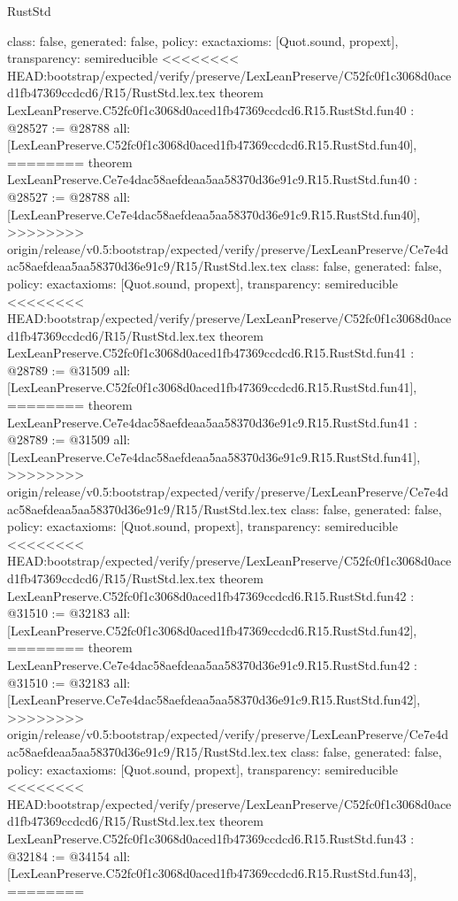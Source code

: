 \begin{lexlean}{RustStd}
\begin{coremodule}
{\begin{coremodule}
{{{{{{{{{{{{{{{{{{{{{{{{{{{{{{{{{{{{{{{{{{{  class: false,
  generated: false,
  policy: exact{axioms: [Quot.sound, propext]},
  transparency: semireducible
}
<<<<<<<< HEAD:bootstrap/expected/verify/preserve/LexLeanPreserve/C52fc0f1c3068d0aced1fb47369ccdcd6/R15/RustStd.lex.tex
theorem LexLeanPreserve.C52fc0f1c3068d0aced1fb47369ccdcd6.R15.RustStd.fun40 : @28527 := @28788 {
  all: [LexLeanPreserve.C52fc0f1c3068d0aced1fb47369ccdcd6.R15.RustStd.fun40],
========
theorem LexLeanPreserve.Ce7e4dac58aefdeaa5aa58370d36e91c9.R15.RustStd.fun40 : @28527 := @28788 {
  all: [LexLeanPreserve.Ce7e4dac58aefdeaa5aa58370d36e91c9.R15.RustStd.fun40],
>>>>>>>> origin/release/v0.5:bootstrap/expected/verify/preserve/LexLeanPreserve/Ce7e4dac58aefdeaa5aa58370d36e91c9/R15/RustStd.lex.tex
  class: false,
  generated: false,
  policy: exact{axioms: [Quot.sound, propext]},
  transparency: semireducible
}
<<<<<<<< HEAD:bootstrap/expected/verify/preserve/LexLeanPreserve/C52fc0f1c3068d0aced1fb47369ccdcd6/R15/RustStd.lex.tex
theorem LexLeanPreserve.C52fc0f1c3068d0aced1fb47369ccdcd6.R15.RustStd.fun41 : @28789 := @31509 {
  all: [LexLeanPreserve.C52fc0f1c3068d0aced1fb47369ccdcd6.R15.RustStd.fun41],
========
theorem LexLeanPreserve.Ce7e4dac58aefdeaa5aa58370d36e91c9.R15.RustStd.fun41 : @28789 := @31509 {
  all: [LexLeanPreserve.Ce7e4dac58aefdeaa5aa58370d36e91c9.R15.RustStd.fun41],
>>>>>>>> origin/release/v0.5:bootstrap/expected/verify/preserve/LexLeanPreserve/Ce7e4dac58aefdeaa5aa58370d36e91c9/R15/RustStd.lex.tex
  class: false,
  generated: false,
  policy: exact{axioms: [Quot.sound, propext]},
  transparency: semireducible
}
<<<<<<<< HEAD:bootstrap/expected/verify/preserve/LexLeanPreserve/C52fc0f1c3068d0aced1fb47369ccdcd6/R15/RustStd.lex.tex
theorem LexLeanPreserve.C52fc0f1c3068d0aced1fb47369ccdcd6.R15.RustStd.fun42 : @31510 := @32183 {
  all: [LexLeanPreserve.C52fc0f1c3068d0aced1fb47369ccdcd6.R15.RustStd.fun42],
========
theorem LexLeanPreserve.Ce7e4dac58aefdeaa5aa58370d36e91c9.R15.RustStd.fun42 : @31510 := @32183 {
  all: [LexLeanPreserve.Ce7e4dac58aefdeaa5aa58370d36e91c9.R15.RustStd.fun42],
>>>>>>>> origin/release/v0.5:bootstrap/expected/verify/preserve/LexLeanPreserve/Ce7e4dac58aefdeaa5aa58370d36e91c9/R15/RustStd.lex.tex
  class: false,
  generated: false,
  policy: exact{axioms: [Quot.sound, propext]},
  transparency: semireducible
}
<<<<<<<< HEAD:bootstrap/expected/verify/preserve/LexLeanPreserve/C52fc0f1c3068d0aced1fb47369ccdcd6/R15/RustStd.lex.tex
theorem LexLeanPreserve.C52fc0f1c3068d0aced1fb47369ccdcd6.R15.RustStd.fun43 : @32184 := @34154 {
  all: [LexLeanPreserve.C52fc0f1c3068d0aced1fb47369ccdcd6.R15.RustStd.fun43],
========
}}}}}}}}}}}}}}}}}}}}}}}}}}}}}}}}}}}}}}}}}}}}}}
\end{coremodule}}
\end{coremodule}
\end{lexlean}
